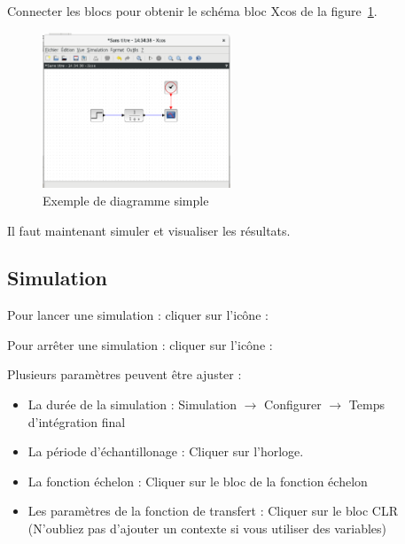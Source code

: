 Connecter les blocs pour obtenir le schéma bloc Xcos de la figure~\ref{fig-simple}.

\begin{figure}
    \centering
    \includegraphics[width=0.5\textwidth]{fig/diagramme_simple.eps}
    \caption{Exemple de diagramme simple\label{fig-simple}}
\end{figure}

Il faut maintenant simuler et visualiser les résultats.  

\newpage
\subsection{Simulation}

Pour lancer une simulation : cliquer sur l'icône : 

Pour arrêter une simulation : cliquer sur l'icône : 

Plusieurs paramètres peuvent être ajuster :
\begin{itemize}
    \item La durée de la simulation : Simulation $\rightarrow$ Configurer $\rightarrow$ Temps d'intégration final
    \item La période d'échantillonage : Cliquer sur l'horloge.
    \item La fonction échelon  : Cliquer sur le bloc de la fonction échelon
    \item Les paramètres de la fonction de transfert : Cliquer sur le bloc CLR 
        (N'oubliez pas d'ajouter un contexte si vous utiliser des variables)
\end{itemize}

